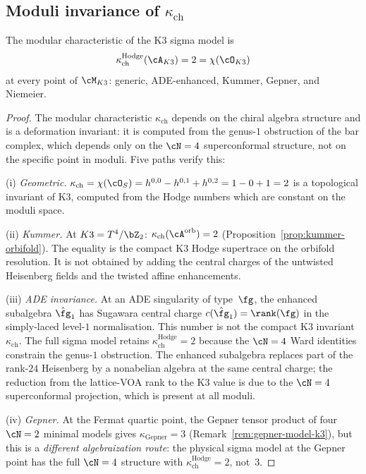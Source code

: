 \subsection{Moduli invariance of \texorpdfstring{$\kappa_{\mathrm{ch}}$}{kappa-ch}}
\label{subsec:k3-kappa-moduli-invariance}

\begin{theorem}
\label{thm:k3-kappa-moduli-invariance}
The modular characteristic of the K3 sigma model is
\[
 \kappa_{\mathrm{ch}}^{\mathrm{Hodge}}(\cA_{K3}) = 2 = \chi(\cO_{K3})
\]
at every point of $\cM_{K3}$: generic, ADE-enhanced, Kummer,
Gepner, and Niemeier.
\end{theorem}

\begin{proof}
The modular characteristic $\kappa_{\mathrm{ch}}$ depends on the
chiral algebra structure and is a deformation invariant:
it is computed from the genus-$1$ obstruction of the bar complex,
which depends only on the $\cN = 4$ superconformal structure, not
on the specific point in moduli. Five paths verify this:

(i) \emph{Geometric.} $\kappa_{\mathrm{ch}} = \chi(\cO_S) =
h^{0,0} - h^{0,1} + h^{0,2} = 1 - 0 + 1 = 2$ is a topological
invariant of K3, computed from the Hodge numbers which are
constant on the moduli space.

(ii) \emph{Kummer.} At $K3 = T^4/\bZ_2$:
$\kappa_{\mathrm{ch}}(\cA^{\mathrm{orb}}) = 2$
(Proposition~\ref{prop:kummer-orbifold}). The equality is the compact
K3 Hodge supertrace on the orbifold resolution. It is not obtained by
adding the central charges of the untwisted Heisenberg fields and the
twisted affine enhancements.

(iii) \emph{ADE invariance.} At an ADE singularity of type~$\fg$,
the enhanced subalgebra $\hat{\fg}_1$ has Sugawara central charge
$c(\hat{\fg}_1)=\rank(\fg)$ in the simply-laced level-$1$ normalisation.
This number is not the compact K3 invariant $\kappa_{\mathrm{ch}}$.
The full sigma model retains $\kappa_{\mathrm{ch}}^{\mathrm{Hodge}} = 2$ because the
$\cN = 4$ Ward identities constrain the genus-$1$ obstruction. The
enhanced subalgebra replaces part of the rank-$24$ Heisenberg by a
nonabelian algebra at the same central charge; the reduction from the
lattice-VOA rank to the K3 value is due to the
$\cN = 4$ superconformal projection, which is present at all moduli.

(iv) \emph{Gepner.} At the Fermat quartic point, the Gepner tensor
product of four $\cN = 2$ minimal models gives
$\kappa_{\mathrm{Gepner}} = 3$ (Remark~\ref{rem:gepner-model-k3}), but this
is a \emph{different algebraization route}: the physical sigma model
at the Gepner point has the full $\cN = 4$ structure with
$\kappa_{\mathrm{ch}}^{\mathrm{Hodge}} = 2$, not~$3$.


\end{proof}
